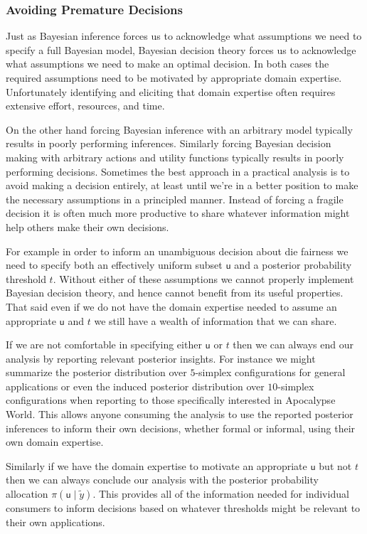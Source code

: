 \documentclass[
  letterpaper,
  DIV=11,
  numbers=noendperiod]{scrartcl}
\begin{document}
\subsubsection{Avoiding Premature
Decisions}\label{avoiding-premature-decisions}

Just as Bayesian inference forces us to acknowledge what assumptions we
need to specify a full Bayesian model, Bayesian decision theory forces
us to acknowledge what assumptions we need to make an optimal decision.
In both cases the required assumptions need to be motivated by
appropriate domain expertise. Unfortunately identifying and eliciting
that domain expertise often requires extensive effort, resources, and
time.

On the other hand forcing Bayesian inference with an arbitrary model
typically results in poorly performing inferences. Similarly forcing
Bayesian decision making with arbitrary actions and utility functions
typically results in poorly performing decisions. Sometimes the best
approach in a practical analysis is to avoid making a decision entirely,
at least until we're in a better position to make the necessary
assumptions in a principled manner. Instead of forcing a fragile
decision it is often much more productive to share whatever information
might help others make their own decisions.

For example in order to inform an unambiguous decision about die
fairness we need to specify both an effectively uniform subset
\(\mathsf{u}\) and a posterior probability threshold \(t\). Without
either of these assumptions we cannot properly implement Bayesian
decision theory, and hence cannot benefit from its useful properties.
That said even if we do not have the domain expertise needed to assume
an appropriate \(\mathsf{u}\) and \(t\) we still have a wealth of
information that we can share.

If we are not comfortable in specifying either \(\mathsf{u}\) or \(t\)
then we can always end our analysis by reporting relevant posterior
insights. For instance we might summarize the posterior distribution
over \(5\)-simplex configurations for general applications or even the
induced posterior distribution over \(10\)-simplex configurations when
reporting to those specifically interested in Apocalypse World. This
allows anyone consuming the analysis to use the reported posterior
inferences to inform their own decisions, whether formal or informal,
using their own domain expertise.

Similarly if we have the domain expertise to motivate an appropriate
\(\mathsf{u}\) but not \(t\) then we can always conclude our analysis
with the posterior probability allocation
\(\pi(\mathsf{u} \mid \tilde{y})\). This provides all of the information
needed for individual consumers to inform decisions based on whatever
thresholds might be relevant to their own applications.
\end{document}
